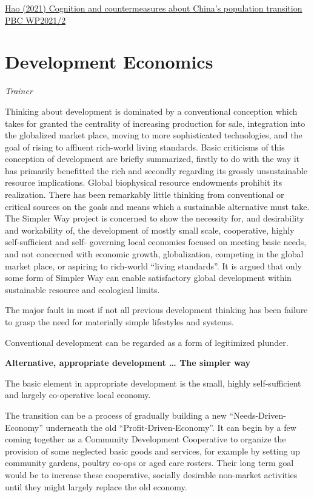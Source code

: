 \documentclass[
]{book}
\begin{document}
\href{http://www.pbc.gov.cn/redianzhuanti/118742/4122386/4122692/4214189/4215394/index.html}{Hao (2021) Cognition and countermeasures about China's population transition PBC WP2021/2}

\hypertarget{development-economics}{%
\chapter{Development Economics}\label{development-economics}}

\emph{Trainer}

Thinking about development is dominated by a conventional conception which takes
for granted the centrality of increasing production for sale, integration into the
globalized market place, moving to more sophisticated technologies, and the goal of
rising to affluent rich-world living standards. Basic criticisms of this conception of
development are briefly summarized, firstly to do with the way it has primarily
benefitted the rich and secondly regarding its grossly unsustainable resource
implications. Global biophysical resource endowments prohibit its realization. There
has been remarkably little thinking from conventional or critical sources on the goals
and means which a sustainable alternative must take. The Simpler Way project is
concerned to show the necessity for, and desirability and workability of, the
development of mostly small scale, cooperative, highly self-sufficient and self-
governing local economies focused on meeting basic needs, and not concerned with
economic growth, globalization, competing in the global market place, or aspiring to
rich-world ``living standards''. It is argued that only some form of Simpler Way can
enable satisfactory global development within sustainable resource and ecological
limits.

The major fault in most if not all previous development thinking has been
failure to grasp the need for materially simple lifestyles and systems.

Conventional development can be regarded as a form of legitimized plunder.

\textbf{Alternative, appropriate development \ldots{} The simpler way}

The basic element in appropriate development is the small, highly self-sufficient
and largely co-operative local economy.

The transition can be a process of gradually building a new ``Needs-Driven-Economy''
underneath the old ``Profit-Driven-Economy''. It can begin by a few coming together as a
Community Development Cooperative to organize the provision of some neglected basic
goods and services, for example by setting up community gardens, poultry co-ops or
aged care rosters. Their long term goal would be to increase these cooperative, socially
desirable non-market activities until they might largely replace the old economy.
\end{document}
